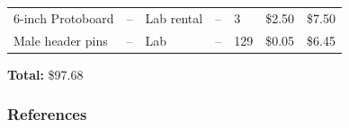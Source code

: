\documentclass[]{article}
\begin{document}
\begin{longtable}[]{@{}lllllll@{}}
\begin{minipage}[t]{0.15\columnwidth}
6-inch Protoboard\strut
\end{minipage} & \begin{minipage}[t]{0.15\columnwidth}\raggedright
--\strut
\end{minipage} & \begin{minipage}[t]{0.10\columnwidth}\raggedright
Lab rental\strut
\end{minipage} & \begin{minipage}[t]{0.17\columnwidth}\raggedright
--\strut
\end{minipage} & \begin{minipage}[t]{0.11\columnwidth}\raggedright
3\strut
\end{minipage} & \begin{minipage}[t]{0.06\columnwidth}\raggedright
\$2.50\strut
\end{minipage} & \begin{minipage}[t]{0.07\columnwidth}\raggedright
\$7.50\strut
\end{minipage}\tabularnewline
\begin{minipage}[t]{0.15\columnwidth}\raggedright
Male header pins\strut
\end{minipage} & \begin{minipage}[t]{0.15\columnwidth}\raggedright
--\strut
\end{minipage} & \begin{minipage}[t]{0.10\columnwidth}\raggedright
Lab\strut
\end{minipage} & \begin{minipage}[t]{0.17\columnwidth}\raggedright
--\strut
\end{minipage} & \begin{minipage}[t]{0.11\columnwidth}\raggedright
129\strut
\end{minipage} & \begin{minipage}[t]{0.06\columnwidth}\raggedright
\$0.05\strut
\end{minipage} & \begin{minipage}[t]{0.07\columnwidth}\raggedright
\$6.45\strut
\end{minipage}\tabularnewline
\bottomrule
\end{longtable}

\textbf{Total:} \$97.68

\hypertarget{references}{%
\subsubsection{References}\label{references}}
\end{document}
